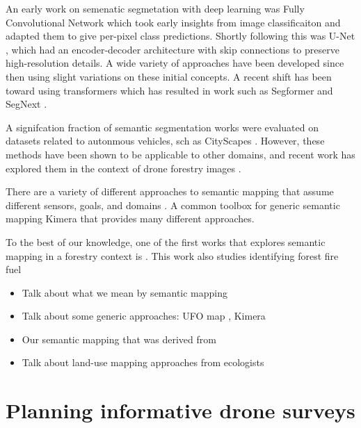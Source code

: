 An early work on semenatic segmetation with deep learning was Fully Convolutional Network \cite{Shelhamer2017FullySegmentation} which took early insights from image classificaiton and adapted them to give per-pixel class predictions. Shortly following this was U-Net \cite{RonnebergerUNET2015}, which had an encoder-decoder architecture with skip connections to preserve high-resolution details. A wide variety of approaches have been developed since then using slight variations on these initial concepts. A recent shift has been toward using transformers \cite{Vaswani2017AttentionNeed} which has resulted in work such as Segformer \cite{Xie2021} and SegNext \cite{Guo2022SegNeXt:Segmentation}.

A signifcation fraction of semantic segmentation works were evaluated on datasets related to autonmous vehicles, sch as CityScapes \cite{Cordts2016}. However, these methods have been shown to be applicable to other domains, and recent work has explored them in the context of drone forestry images \cite{Nogueira2017SemanticConvNets, Neves2020SemanticU}. 


There are a variety of different approaches to semantic mapping that assume different sensors, goals, and domains \cite{Kostavelis2015SemanticSurvey}.
A common toolbox for generic semantic mapping Kimera \cite{Rosinol2020} that provides many different approaches.

To the best of our knowledge, one of the first works that explores semantic mapping in a forestry context is \cite{Andrada2022IntegrationRoboticsb}. This work also studies identifying forest fire fuel   

\begin{itemize}
    \item Talk about what we mean by semantic mapping 
    \item Talk about some generic approaches: UFO map \cite{Duberg2020UFOMap:Unknown}, Kimera 
    \item Our semantic mapping \cite{RussellUnmannedMitigation} that was derived from \cite{semantic_slam_RGBD}
    \item Talk about land-use mapping approaches from ecologists \cite{Liu2018DeepClassification} 
\end{itemize}



\section{Planning informative drone surveys}

